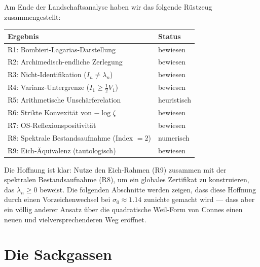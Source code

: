 \documentclass[12pt,a4paper]{article}
\theoremstyle{definition}
\theoremstyle{remark}
\begin{document}
Am Ende der Landschaftsanalyse haben wir das folgende Rüstzeug zusammengestellt:

\begin{center}
\renewcommand{\arraystretch}{1.15}
\begin{tabular}{ll}
\toprule
\textbf{Ergebnis} & \textbf{Status} \\
\midrule
R1: Bombieri-Lagarias-Darstellung & bewiesen \\
R2: Archimedisch-endliche Zerlegung & bewiesen \\
R3: Nicht-Identifikation ($I_n \neq \lambda_n$) & bewiesen \\
R4: Varianz-Untergrenze ($I_1 \geq \frac{1}{2}V_1$) & bewiesen \\
R5: Arithmetische Unschärferelation & heuristisch \\
R6: Strikte Konvexität von $-\log\zeta$ & bewiesen \\
R7: OS-Reflexionspositivität & bewiesen \\
R8: Spektrale Bestandsaufnahme (Index $= 2$) & numerisch \\
R9: Eich-Äquivalenz (tautologisch) & bewiesen \\
\bottomrule
\end{tabular}
\end{center}

Die Hoffnung ist klar: Nutze den Eich-Rahmen (R9) zusammen mit der spektralen Bestandsaufnahme (R8), um ein globales Zertifikat zu konstruieren, das $\lambda_n \geq 0$ beweist. Die folgenden Abschnitte werden zeigen, dass diese Hoffnung durch einen Vorzeichenwechsel bei $\sigma_0 \approx 1.14$ zunichte gemacht wird --- dass aber ein völlig anderer Ansatz über die quadratische Weil-Form von Connes einen neuen und vielversprechenderen Weg eröffnet.



\part*{Die Sackgassen}


\end{document}
